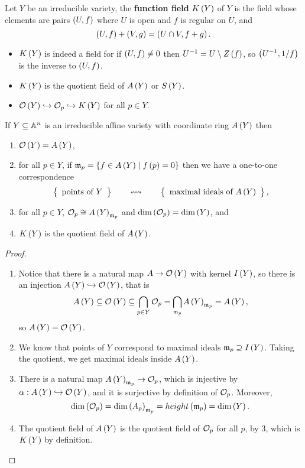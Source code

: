 
\begin{definition}
Let $ Y $ be an irreducible variety, the \textbf{function field} $ K\left( Y \right) $ of $ Y $ is the field whose elements are pairs $ \left( U, f \right) $ where $ U $ is open and $ f $ is regular on $ U $, and
$$ \left( U, f \right) + \left( V, g \right) = \left( U \cap V, f + g \right). $$
\end{definition}

\begin{remark}
\hfill
\begin{itemize}
\item $ K\left( Y \right) $ is indeed a field for if $ \left( U, f \right) \ne 0 $ then $ U^{-1} = U \setminus Z\left( f \right) $, so $ \left( U^{-1}, 1 / f \right) $ is the inverse to $ \left( U, f \right) $.
\item $ K\left( Y \right) $ is the quotient field of $ A\left( Y \right) $ or $ S\left( Y \right) $.
\item $ \mathcal{O}\left( Y \right) \hookrightarrow \mathcal{O}_p \hookrightarrow K\left( Y \right) $ for all $ p \in Y $.
\end{itemize}
\end{remark}

\begin{theorem}
If $ Y \subseteq \mathbb{A}^n $ is an irreducible affine variety with coordinate ring $ A\left( Y \right) $ then
\begin{enumerate}
\item $ \mathcal{O}\left( Y \right) = A\left( Y \right) $,
\item for all $ p \in Y $, if $ \mathfrak{m}_p = \left\{ f \in A\left( Y \right) \mid f\left( p \right) = 0 \right\} $ then we have a one-to-one correspondence
$$ \correspondence{\text{points of} \ Y}{\text{maximal ideals of} \ A\rb{Y}}, $$
\item for all $ p \in Y $, $ \mathcal{O}_p \cong A\left( Y \right)_{\mathfrak{m}_p} $ and $ \dim\left( \mathcal{O}_p \right) = \dim\left( Y \right) $, and
\item $ K\left( Y \right) $ is the quotient field of $ A\left( Y \right) $.
\end{enumerate}
\end{theorem}

\begin{proof}
\hfill
\begin{enumerate}
\item Notice that there is a natural map $ A \to \mathcal{O}\left( Y \right) $ with kernel $ I\left( Y \right) $, so there is an injection $ A\left( Y \right) \hookrightarrow \mathcal{O}\left( Y \right) $, that is
$$ A\left( Y \right) \subseteq \mathcal{O}\left( Y \right) \subseteq \bigcap_{p \in Y} \mathcal{O}_p = \bigcap_{\mathfrak{m}_p} A\left( Y \right)_{\mathfrak{m}_p} = A\left( Y \right), $$
so $ A\left( Y \right) = \mathcal{O}\left( Y \right) $.
\item We know that points of $ Y $ correspond to maximal ideals $ \mathfrak{m}_p \supseteq I\left( Y \right) $. Taking the quotient, we get maximal ideals inside $ A\left( Y \right) $.
\item There is a natural map $ A\left( Y \right)_{\mathfrak{m}_p} \to \mathcal{O}_p $, which is injective by $ \alpha : A\left( Y \right) \hookrightarrow \mathcal{O}\left( Y \right) $, and it is surjective by definition of $ \mathcal{O}_p $. Moreover,
$$ \dim\left( \mathcal{O}_p \right) = \dim\left( A_p \right)_{\mathfrak{m}_p} = height\left( \mathfrak{m}_p \right) = \dim\left( Y \right). $$
\item The quotient field of $ A\left( Y \right) $ is the quotient field of $ \mathcal{O}_p $ for all $ p $, by $ 3 $, which is $ K\left( Y \right) $ by definition.
\end{enumerate}
\end{proof}

